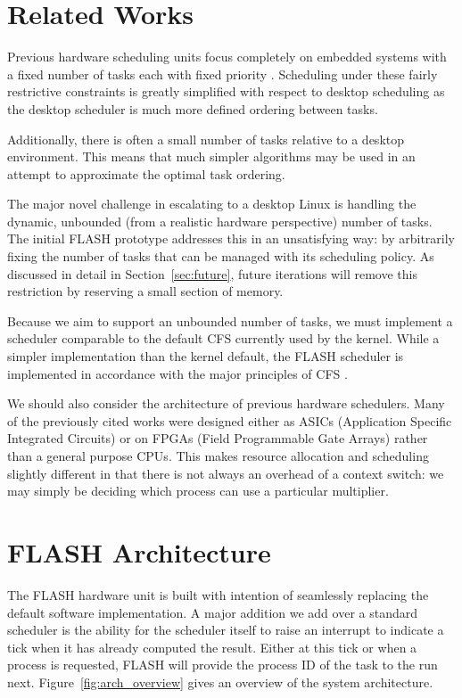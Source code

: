 \documentclass{sig-alternate-10pt}
\begin{document}
\section{Related Works}
\label{sec:related_works}
Previous hardware scheduling units focus completely on embedded systems with
a fixed number of tasks each with fixed priority
\cite{kuacharoen2003configurable, morton2004hardware, nacul2007hardware,
nakano1995hardware, park2008hardware}.  Scheduling under these fairly
restrictive constraints is greatly simplified with respect to desktop
scheduling as the desktop scheduler is much more defined ordering between
tasks.

Additionally, there is often a small number of tasks relative to a desktop
environment.  This means that much simpler algorithms may be used in an
attempt to approximate the optimal task ordering.

The major novel challenge in escalating to a desktop Linux is handling the
dynamic, unbounded (from a realistic hardware perspective) number of tasks.
The initial FLASH prototype addresses this in an unsatisfying way: by
arbitrarily fixing the number of tasks that can be managed with its
scheduling policy.  As discussed in detail in Section~\ref{sec:future},
future iterations will remove this restriction by reserving a small section
of memory.

Because we aim to support an unbounded number of tasks, we must implement
a scheduler comparable to the default CFS currently used by the kernel.
While a simpler implementation than the kernel default, the FLASH scheduler
is implemented in accordance with the major principles of CFS
\cite{wong2008cfs}.

We should also consider the architecture of previous hardware schedulers.
Many of the previously cited works were designed either as ASICs
(Application Specific Integrated Circuits) or on FPGAs (Field Programmable
Gate Arrays) rather than a general purpose CPUs.  This makes resource
allocation and scheduling slightly different in that there is not always an
overhead of a context switch: we may simply be deciding which process can
use a particular multiplier.


\section{FLASH Architecture}
\label{sec:arch}
The FLASH hardware unit is built with intention of seamlessly replacing the default software implementation. A major addition we add over a standard
scheduler is the ability for the scheduler itself to raise an
interrupt to indicate a tick when it has already computed the result. Either at this tick or when a process is
requested, FLASH will provide the process ID of the task to the run next.
Figure~\ref{fig:arch_overview} gives an overview of the system architecture.
\end{document}
